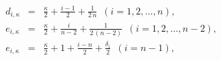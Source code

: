 \begin{equation}
\begin{array}{rcl}
d_{i,\kappa}&=&\frac{\kappa}{2}+\frac{i-1}{2}+\frac{1}{2\,n} \,\,\,
(i=1,2,\dots,n),\\
e_{i,\kappa}&=&\frac{\kappa}{2}+\frac{i}{n-2}+\frac{1}{2\,(n-2)}
\,\,\, (i=1,2,\dots,n-2),\\
e_{i,\kappa}&=&\frac{\kappa}{2}+1+\frac{i-n}{2}+\frac{\delta_{i}}{2}
\,\,\, (i=n-1),
\end{array}
\end{equation}


